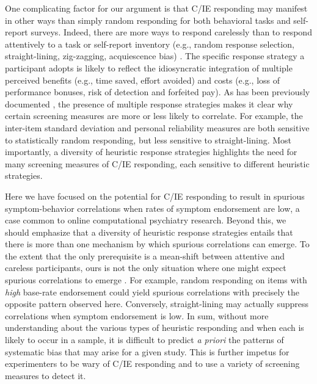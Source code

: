 \documentclass[a4paper,notitlepage,12pt]{article}
\begin{document}
One complicating factor for our argument is that C/IE responding may manifest in other ways than simply random responding for both behavioral tasks and self-report surveys. Indeed, there are more ways to respond carelessly than to respond attentively to a task or self-report inventory (e.g., random response selection, straight-lining, zig-zagging, acquiescence bias) \cite{curran2016methods}. The specific response strategy a participant adopts is likely to reflect the idiosyncratic integration of multiple perceived benefits (e.g., time saved, effort avoided) and costs (e.g., loss of performance bonuses, risk of detection and forfeited pay). As has been previously documented \cite{desimone2018dirty}, the presence of multiple response strategies makes it clear why certain screening measures are more or less likely to correlate. For example, the inter-item standard deviation and personal reliability measures are both sensitive to statistically random responding, but less sensitive to straight-lining. Most importantly, a diversity of heuristic response strategies highlights the need for many screening measures of C/IE responding, each sensitive to different heuristic strategies. 

Here we have focused on the potential for C/IE responding to result in spurious symptom-behavior correlations when rates of symptom endorsement are low, a case common to online computational psychiatry research. Beyond this, we should emphasize that a diversity of heuristic response strategies entails that there is more than one mechanism by which spurious correlations can emerge. To the extent that the only prerequisite is a mean-shift between attentive and careless participants, ours is not the only situation where one might expect spurious correlations to emerge \cite{huang2015insufficient}. For example, random responding on items with \emph{high} base-rate endorsement could yield spurious correlations with precisely the opposite pattern observed here. Conversely, straight-lining may actually suppress correlations when symptom endorsement is low. In sum, without more understanding about the various types of heuristic responding and when each is likely to occur in a sample, it is difficult to predict {\it a priori} the patterns of systematic bias that may arise for a given study. This is further impetus for experimenters to be wary of C/IE responding and to use a variety of screening measures to detect it. 
\end{document}

